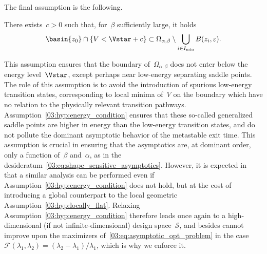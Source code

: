         The final assumption is the following.
        \begin{hypothesis}
            \label{03:hyp:energy_condition}
            There exists~$c>0$ such that, for~$\beta$ sufficiently large, it holds
        \begin{equation}
            \basin{z_0}\cap \left\{V < \Vstar + c\right\}\subset \Omega_{\alpha,\beta} \setminus \bigcup_{i\in I_{\min}} B(z_i,\varepsilon).
        \end{equation}
        \end{hypothesis}
        This assumption ensures that the boundary of~$\Omega_{\alpha,\beta}$ does not enter below the energy level~$\Vstar$, except perhaps near low-energy separating saddle points. The role of this assumption is to avoid the introduction of spurious low-energy transition states, corresponding to local minima of~$V$ on the boundary which have no relation to the physically relevant transition pathways.
        Assumption~\ref{03:hyp:energy_condition} ensures that these so-called generalized saddle points are higher in energy than the low-energy transition states, and do not pollute the dominant asymptotic behavior of the metastable exit time. This assumption is crucial in ensuring that the asymptotics are, at dominant order, only a function of~$\beta$ and~$\alpha$, as in the desideratum~\eqref{03:eq:shape_sensitive_asymptotics}.
        However, it is expected in~\cite{BLS25a} that a similar analysis can be performed even if Assumption~\eqref{03:hyp:energy_condition} does not hold, but at the cost of introducing a global counterpart to the local geometric Assumption~\eqref{03:hyp:locally_flat}. Relaxing Assumption~\ref{03:hyp:energy_condition} therefore leads once again to a high-dimensional (if not infinite-dimensional) design space~$\mathcal S$, and besides cannot improve upon the maximizers of~\eqref{03:eq:asymptotic_opt_problem} in the case~$\mathcal F(\lambda_1,\lambda_2)=(\lambda_2-\lambda_1)/\lambda_1$, which is why we enforce it.


